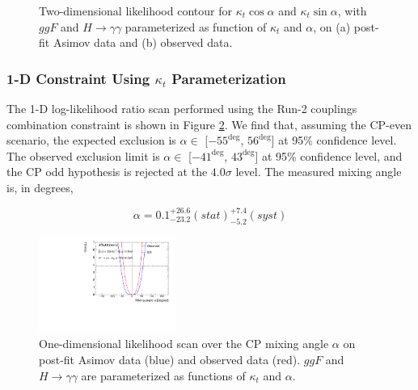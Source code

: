 \begin{figure}[htbp]
  \centering
  \caption{Two-dimensional likelihood contour for $\kappa_t \cos\alpha$ and $\kappa_t \sin\alpha$, with $ggF$ and $H \rightarrow \gamma\gamma$ parameterized as function of $\kappa_t$ and $\alpha$, on (a) post-fit Asimov data and (b) observed data.
  \label{fig:s3:contours}}
\end{figure}

\subsubsection{1-D Constraint Using $\kappa_{t}$ Parameterization}

The 1-D log-likelihood ratio scan performed using the Run-2 couplings combination constraint is shown in Figure \ref{fig:alphascan_expobs_resolve}. We find that, assuming the CP-even scenario, the expected exclusion is $\alpha \in$ [$-55^{\deg}$, $56^{\deg}$] at 95\% confidence level. The observed exclusion limit is  $\alpha \in$ [$-41^{\deg}$, $43^{\deg}$] at 95\% confidence level, and the CP odd hypothesis is rejected at the $4.0\sigma$ level. The measured mixing angle is, in degrees, 

\begin{equation}
\alpha = 0.1^{+26.6}_{-23.2}(stat)^{+7.4}_{-5.2}(syst)
\end{equation}

\begin{figure}[htbp]
  \centering
  \includegraphics[width=0.4\textwidth]{figures/tthcp_results/nllscan_alpha_expobs_resolve.pdf}
  \caption{One-dimensional likelihood scan over the CP mixing angle $\alpha$ on post-fit Asimov data (blue) and observed data (red).  $ggF$ and $H \rightarrow \gamma\gamma$ are parameterized as functions of $\kappa_t$ and $\alpha$.
  \label{fig:alphascan_expobs_resolve}}
\end{figure}
